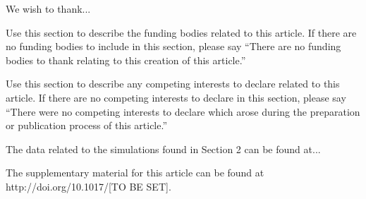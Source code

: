 \documentclass{aptpub}
\begin{document}

\acks %
\noindent We wish to thank...



\fund %
\noindent Use this section to describe the funding bodies related to this article. If there are no funding bodies to include in this section, please say ``There are no funding bodies to thank relating to this creation of this article.''



\competing %
\noindent Use this section to describe any competing interests to declare related to this article. If there are no competing interests to declare in this section, please say ``There were no competing interests to declare which arose during the preparation or publication process of this article.''



\data %
\noindent The data related to the simulations found in Section 2 can be found at...



\supp \noindent The supplementary material for this article can be found at http://doi.org/10.1017/[TO BE SET]. %



%
%
%
%



\end{document}
